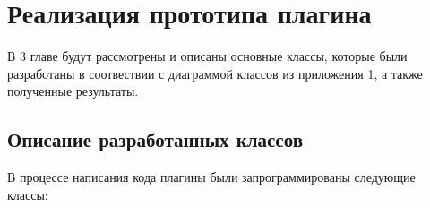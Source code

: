 \chapter{Реализация прототипа плагина} \label{ch3}

В 3 главе будут рассмотрены и описаны основные классы, которые были разработаны в соотвествии с диаграммой классов из приложения 1, а также полученные результаты.

\section{Описание разработанных классов} \label{ch3:sec1}

В процессе написания кода плагины были запрограммированы следующие классы:

